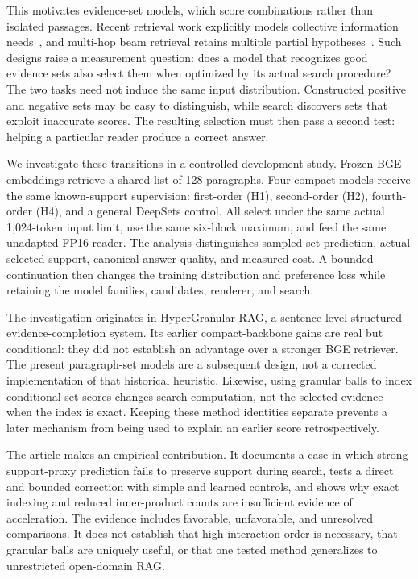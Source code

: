 \documentclass[pdflatex,sn-mathphys-num]{sn-jnl}
\begin{document}
This motivates evidence-set models, which score combinations rather than
isolated passages. Recent retrieval work explicitly models collective
information needs~\cite{lee2025setr}, and multi-hop beam retrieval retains
multiple partial hypotheses~\cite{zhang2024beam}. Such designs raise a
measurement question: does a model that recognizes good evidence sets also
select them when optimized by its actual search procedure? The two tasks
need not induce the same input distribution. Constructed positive and
negative sets may be easy to distinguish, while search discovers sets that
exploit inaccurate scores. The resulting selection must then pass a second
test: helping a particular reader produce a correct answer.

We investigate these transitions in a controlled development study. Frozen
BGE embeddings retrieve a shared list of 128 paragraphs. Four compact
models receive the same known-support supervision: first-order (H1),
second-order (H2), fourth-order (H4), and a general DeepSets control.
All select under the same actual 1,024-token input limit, use the same
six-block maximum, and feed the same unadapted FP16 reader. The analysis
distinguishes sampled-set prediction, actual selected support, canonical
answer quality, and measured cost. A bounded continuation then changes the
training distribution and preference loss while retaining the model
families, candidates, renderer, and search.

The investigation originates in HyperGranular-RAG, a sentence-level
structured evidence-completion system. Its earlier compact-backbone gains
are real but conditional: they did not establish an advantage over a
stronger BGE retriever. The present paragraph-set models are a subsequent
design, not a corrected implementation of that historical heuristic.
Likewise, using granular balls to index conditional set scores changes
search computation, not the selected evidence when the index is exact.
Keeping these method identities separate prevents a later mechanism from
being used to explain an earlier score retrospectively.

The article makes an empirical contribution. It documents a case in which
strong support-proxy prediction fails to preserve support during search,
tests a direct and bounded correction with simple and learned controls,
and shows why exact indexing and reduced inner-product counts are
insufficient evidence of acceleration. The evidence includes favorable,
unfavorable, and unresolved comparisons. It does not establish that high
interaction order is necessary, that granular balls are uniquely useful,
or that one tested method generalizes to unrestricted open-domain RAG.
\end{document}
